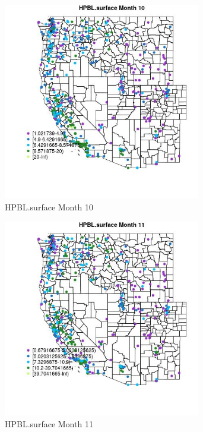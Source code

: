\clearpage 

\begin{figure} 
\centering  
\includegraphics[width=0.77\textwidth]{Code_Outputs/ML_input_report_ML_input_PM25_Step5_part_d_de_duplicated_aves_ML_input_MapObsMo10HPBLsurface.jpg} 
\caption{\label{fig:ML_input_report_ML_input_PM25_Step5_part_d_de_duplicated_aves_ML_inputMapObsMo10HPBLsurface}HPBL.surface Month 10} 
\end{figure} 
 

\begin{figure} 
\centering  
\includegraphics[width=0.77\textwidth]{Code_Outputs/ML_input_report_ML_input_PM25_Step5_part_d_de_duplicated_aves_ML_input_MapObsMo11HPBLsurface.jpg} 
\caption{\label{fig:ML_input_report_ML_input_PM25_Step5_part_d_de_duplicated_aves_ML_inputMapObsMo11HPBLsurface}HPBL.surface Month 11} 
\end{figure} 
 

